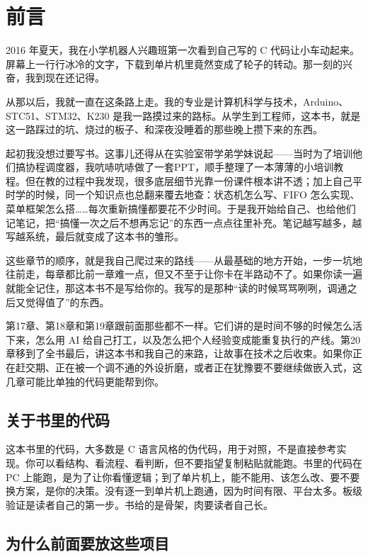 \chapter*{前\hspace{1em}言}

2016 年夏天，我在小学机器人兴趣班第一次看到自己写的 C 代码让小车动起来。屏幕上一行行冰冷的文字，下载到单片机里竟然变成了轮子的转动。那一刻的兴奋，我到现在还记得。

从那以后，我就一直在这条路上走。我的专业是计算机科学与技术，Arduino、STC51、STM32、K230 是我一路摸过来的路标。从学生到工程师，这本书，就是这一路踩过的坑、烧过的板子、和深夜没睡着的那些晚上攒下来的东西。

起初我没想过要写书。这事儿还得从在实验室带学弟学妹说起——当时为了培训他们搞协程调度器，我吭哧吭哧做了一套PPT，顺手整理了一本薄薄的小培训教程。但在教的过程中我发现，很多底层细节光靠一份课件根本讲不透；加上自己平时学的时候，同一个知识点也总翻来覆去地查：状态机怎么写、FIFO 怎么实现、菜单框架怎么搭……每次重新搞懂都要花不少时间。于是我开始给自己、也给他们记笔记，把“搞懂一次之后不想再忘记”的东西一点点往里补充。笔记越写越多，越写越系统，最后就变成了这本书的雏形。

这些章节的顺序，就是我自己爬过来的路线——从最基础的地方开始，一步一坑地往前走，每章都比前一章难一点，但又不至于让你卡在半路动不了。如果你读一遍就能全记住，那这本书不是写给你的。我写的是那种“读的时候骂骂咧咧，调通之后又觉得值了”的东西。

第17章、第18章和第19章跟前面那些都不一样。它们讲的是时间不够的时候怎么活下来，怎么用 AI 给自己打工，以及怎么把个人经验变成能重复执行的产线。第20章移到了全书最后，讲这本书和我自己的来路，让故事在技术之后收束。如果你正在赶交期、正在被一个调不通的外设折磨，或者正在犹豫要不要继续做嵌入式，这几章可能比单独的代码更能帮到你。

\section*{关于书里的代码}
这本书里的代码，大多数是 C 语言风格的伪代码，用于对照，不是直接参考实现。你可以看结构、看流程、看判断，但不要指望复制粘贴就能跑。书里的代码在 PC 上能跑，是为了让你看懂逻辑；到了单片机上，能不能用、该怎么改、要不要换方案，是你的决策。没有逐一到单片机上跑通，因为时间有限、平台太多。板级验证是读者自己的第一步。书给的是骨架，肉要读者自己长。

\section*{为什么前面要放这些项目}

